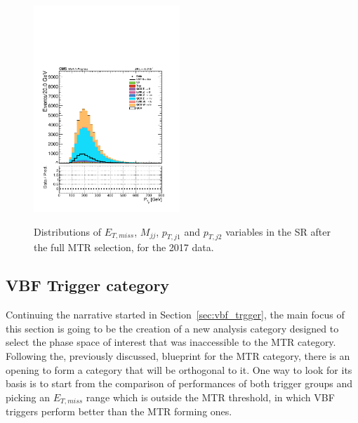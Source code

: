 \begin{figure}[htbp]
{    \includegraphics[width=0.49\textwidth]{Analysis_strategy/MTR_2017_SR/Leading_jet_pt.pdf}
    }
  \caption{Distributions of $E_{T,miss}$, $M_{jj}$, $p_{T,j1}$ and $p_{T,j2}$ variables in the SR after the full MTR selection, for the 2017 data.}
  \label{fig:sr_n-1_shapes_2}
\end{figure}







\subsection{VBF Trigger category}
\label{subsec:vtr_selection}
\hspace{10pt} Continuing the narrative started in Section~\ref{sec:vbf_trgger}, the main focus of this section is going to be the creation of a new analysis category designed to select the phase space of interest that was inaccessible to the MTR category. Following the, previously discussed, blueprint for the MTR category, there is an opening to form a category that will be orthogonal to it. One way to look for its basis is to start from the comparison of performances of both trigger groups and picking an $E_{T,miss}$ range which is outside the MTR threshold, in which VBF triggers perform better than the MTR forming ones. 

